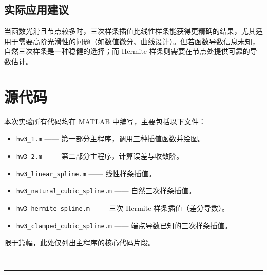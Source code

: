 \documentclass{article}
\begin{document}
\subsection{实际应用建议}
当函数光滑且节点较多时，三次样条插值比线性样条能获得更精确的结果，尤其适用于需要高阶光滑性的问题（如数值微分、曲线设计）。但若函数导数信息未知，自然三次样条是一种稳健的选择；而 Hermite 样条则需要在节点处提供可靠的导数估计。

\appendix
\section{源代码}
本次实验所有代码均在 MATLAB 中编写，主要包括以下文件：
\begin{itemize}
    \item \texttt{hw3\_1.m} —— 第一部分主程序，调用三种插值函数并绘图。
    \item \texttt{hw3\_2.m} —— 第二部分主程序，计算误差与收敛阶。
    \item \texttt{hw3\_linear\_spline.m} —— 线性样条插值。
    \item \texttt{hw3\_natural\_cubic\_spline.m} —— 自然三次样条插值。
    \item \texttt{hw3\_hermite\_spline.m} —— 三次 Hermite 样条插值（差分导数）。
    \item \texttt{hw3\_clamped\_cubic\_spline.m} —— 端点导数已知的三次样条插值。
\end{itemize}
限于篇幅，此处仅列出主程序的核心代码片段。

\small
\hrule

\hrule

\hrule
\end{document}
